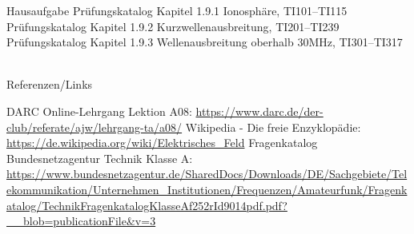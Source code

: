 \begin{frame}
  \begin{exampleblock}{Hausaufgabe}
    Prüfungskatalog Kapitel 1.9.1 Ionosphäre, TI101--TI115\\
    Prüfungskatalog Kapitel 1.9.2 Kurzwellenausbreitung, TI201--TI239\\
    Prüfungskatalog Kapitel 1.9.3 Wellenausbreitung oberhalb 30MHz, TI301--TI317
  \end{exampleblock}
\end{frame}

\renewcommand{\refname}{Referenzen}

\hypertarget{refs}{}
\textcolor{white}{} \\ %
\Large Referenzen/Links
\footnotesize

\begin{thebibliography}{}
    DARC Online-Lehrgang Lektion A08:
    \url{https://www.darc.de/der-club/referate/ajw/lehrgang-ta/a08/}
      Wikipedia - Die freie Enzyklopädie:
    \url{https://de.wikipedia.org/wiki/Elektrisches_Feld}
     Fragenkatalog Bundesnetzagentur Technik Klasse A:
    \url{https://www.bundesnetzagentur.de/SharedDocs/Downloads/DE/Sachgebiete/Telekommunikation/Unternehmen_Institutionen/Frequenzen/Amateurfunk/Fragenkatalog/TechnikFragenkatalogKlasseAf252rId9014pdf.pdf?__blob=publicationFile&v=3}
\end{thebibliography}


